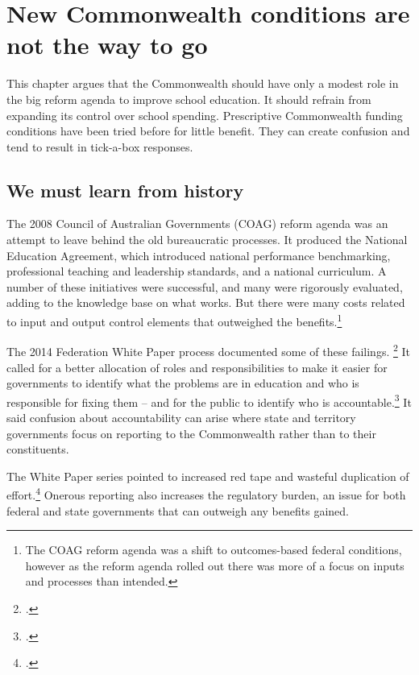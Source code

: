 \chapter{New Commonwealth conditions are not the way to go}\label{chap:Commonwealth-conditions}

This chapter argues that the Commonwealth should have only a modest role in the big reform agenda to improve school education. It should refrain from expanding its control over school spending. Prescriptive Commonwealth funding conditions have been tried before for little benefit. They can create confusion and tend to result in tick-a-box responses. 

\section{We must learn from history}\label{sec:learn-from-history}

The 2008 Council of Australian Governments (COAG) reform agenda was an attempt to leave behind the old bureaucratic processes. It produced the National Education Agreement, which introduced national performance benchmarking, professional teaching and leadership standards, and a national curriculum. A number of these initiatives were successful, and many were rigorously evaluated, adding to the knowledge base on what works. But there were many costs related to input and output control elements that outweighed the benefits.\footnote{The COAG reform agenda was a shift to outcomes-based federal conditions, however as the reform agenda rolled out there was more of a focus on inputs and processes than intended.}

The 2014 Federation White Paper process documented some of these failings.%
\footcite{2014AustralianGovernmentReformoftheFederationWhitePaper}
It called for a better allocation of roles and responsibilities to make it easier for governments to identify what the problems are in education and who is responsible for fixing them -- and for the public to identify who is accountable.\footcite{2014AustralianGovernmentReformoftheFederationWhitePaper}
It said confusion about accountability can arise where state and territory governments focus on reporting to the Commonwealth rather than to their constituents.

The White Paper series pointed to increased red tape and wasteful duplication of effort.\footcite{2014AustralianGovernmentReformoftheFederationWhitePaper} Onerous reporting also increases the regulatory burden, an issue for both federal and state governments that can outweigh any benefits gained. 

